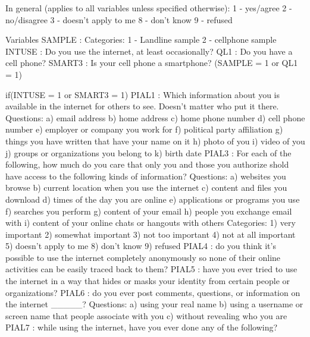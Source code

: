 In general (applies to all variables unless specified otherwise):
    1 - yes/agree
    2 - no/disagree
    3 - doesn't apply to me
    8 - don't know
    9 - refused

Variables
    SAMPLE  :
        Categories:
            1 - Landline sample
            2 - cellphone sample
    INTUSE  : Do you use the internet, at least occasionally?
    QL1     : Do you have a cell phone?
    SMART3  : Is your cell phone a smartphone? (SAMPLE = 1 or QL1 = 1)
    
    if(INTUSE = 1 or SMART3 = 1)
    PIAL1   : Which information about you is available in the internet for others to see. Doesn't matter who put it there.
        Questions:
            a) email address
            b) home address
            c) home phone number
            d) cell phone number
            e) employer or company you work for
            f) political party affiliation
            g) things you have written that have your name on it
            h) photo of you
            i) video of you
            j) groups or organizations you belong to
            k) birth date
    PIAL3   : For each of the following, how much do you care that only you and those
                you authorize shold have access to the following kinds of information?
        Questions:
            a) websites you browse
            b) current location when you use the internet
            c) content and files you download
            d) times of the day you are online
            e) applications or programs you use
            f) searches you perform
            g) content of your email
            h) people you exchange email with
            i) content of your online chats or hangouts with others
        Categories:
            1) very important
            2) somewhat important
            3) not too important
            4) not at all important
            5) doesn't apply to me
            8) don't know
            9) refused
    PIAL4   : do you think it's possible to use the internet completely anonymously so
                none of their online activities can be easily traced back to them?
    PIAL5   : have you ever tried to use the internet in a way that hides or masks your
                identity from certain people or organizations?
    PIAL6   : do you ever post comments, questions, or information on the internet
                _____?
        Questions:
            a) using your real name
            b) using a username or screen name that people associate with you
            c) without revealing who you are
    PIAL7   : while using the internet, have you ever done any of the following?
